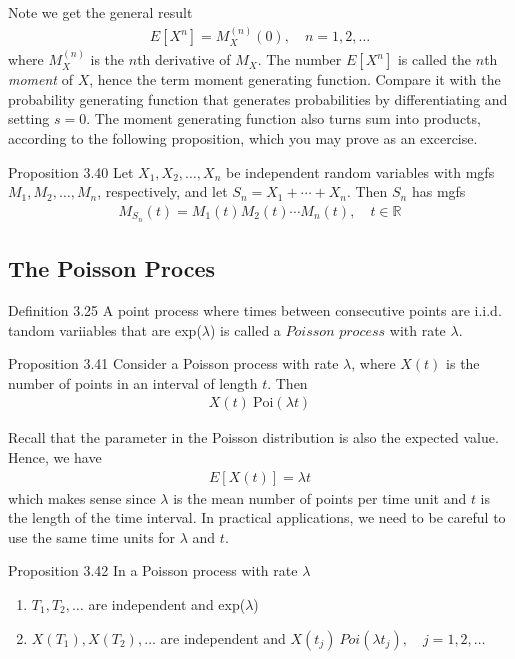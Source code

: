 Note we get the general result
\begin{align*}
  E[X^n] = M^{(n)}_X(0), \quad n = 1, 2, \ldots
\end{align*}
where $M_X^{(n)}$ is the $n$th derivative of $M_X$.
The number $E[X^n]$ is called the $n$th \textit{moment} of $X$, hence the term moment generating function. Compare it with the probability generating function that generates probabilities by differentiating and setting $s = 0$. The moment generating function also turns sum into products, according to the following proposition, which you may prove as an excercise.
\begin{boks}{Proposition 3.40}
  Let $X_1, X_2, \ldots, X_n$ be independent random variables with mgfs $M_1, M_2, \ldots, M_n$, respectively, and let $S_n = X_1 + \cdots + X_n$. Then $S_n$ has mgfs
  \begin{align*}
    M_{S_n}(t) = M_1(t)M_2(t)\cdots M_n(t), \quad t \in \mathbb{R}
  \end{align*}
\end{boks}

\subsection{The Poisson Proces}
\begin{boks}{Definition 3.25}
  A point process where times between consecutive points are i.i.d. tandom variiables that are exp($\lambda$) is called a $Poisson$ $process$ with rate $\lambda$.
\end{boks}

\begin{boks}{Proposition 3.41}
  Consider a Poisson process with rate $\lambda$, where $X(t)$ is the number of points in an interval of length $t$.
  Then
  \begin{align*}
    X(t) ~ \text{Poi}(\lambda t)
  \end{align*}
\end{boks}
Recall that the parameter in the Poisson distribution is also the expected value.
Hence, we have
\begin{align*}
  E[X(t)] = \lambda t
\end{align*}
which makes sense since $\lambda$ is the mean number of points per time unit and $t$ is the length of the time interval.
In practical applications, we need to be careful to use the same time units for $\lambda$ and $t$.
\begin{boks}{Proposition 3.42}
  In a Poisson process with rate $\lambda$
  \begin{enumerate}
    \item $T_1, T_2, \ldots$ are independent and exp($\lambda$)
    \item $X(T_1), X(T_2), \ldots$ are independent and $X(t_j) ~ Poi(\lambda t_j), \quad j = 1, 2, \ldots$
  \end{enumerate}
\end{boks}
